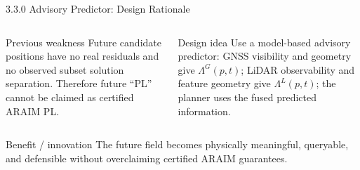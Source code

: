 \documentclass[10pt,aspectratio=169,xcolor=dvipsnames]{beamer}
\begin{document}
\begin{frame}{3.3.0 Advisory Predictor: Design Rationale}

  \small
  \begin{columns}[T]
    \begin{alertblock}{Previous weakness}
      \footnotesize
      Future candidate positions have no real residuals and no observed subset solution separation. Therefore future ``PL'' cannot be claimed as certified ARAIM PL.
    \end{alertblock}
    \begin{exampleblock}{Design idea}
      \footnotesize
      Use a model-based advisory predictor: GNSS visibility and geometry give $\Lambda^G(p,t)$; LiDAR observability and feature geometry give $\Lambda^L(p,t)$; the planner uses the fused predicted information.
    \end{exampleblock}
  \end{columns}
  \begin{block}{Benefit / innovation}
    \footnotesize The future field becomes physically meaningful, queryable, and defensible without overclaiming certified ARAIM guarantees.
  \end{block}

\end{frame}
\end{document}
